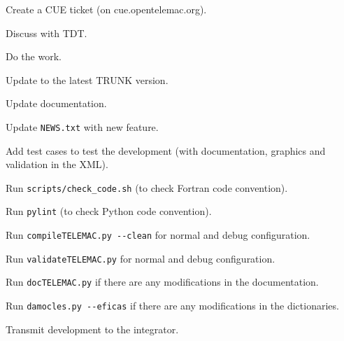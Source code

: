 \begin{todolist}
\setlength\itemsep{0.01em}
\item Create a CUE ticket (on cue.opentelemac.org).
\item Discuss with TDT\@.
\item Do the work.
\item Update to the latest TRUNK version.
\item Update documentation.
\item Update \verb!NEWS.txt! with new feature.
\item Add test cases to test the development (with documentation, graphics and
  validation in the XML).
\item Run \verb!scripts/check_code.sh! (to check Fortran code convention).
\item Run \verb!pylint! (to check Python code convention).
\item Run \verb!compileTELEMAC.py --clean! for normal and debug configuration.
\item Run \verb!validateTELEMAC.py! for normal and debug configuration.
\item Run \verb!docTELEMAC.py! if there are any modifications in the documentation.
\item Run \verb!damocles.py --eficas! if there are any modifications in the
  dictionaries.
\item Transmit development to the integrator.
\end{todolist}
